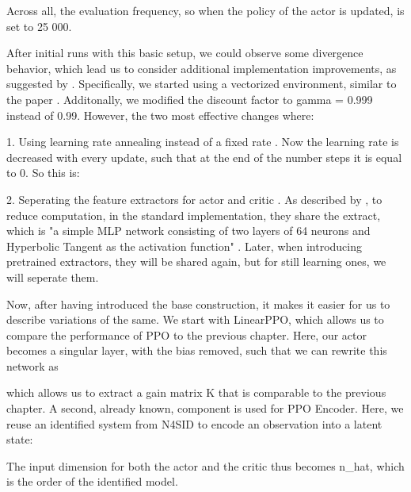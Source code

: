 
Across all, the evaluation frequency, so when the policy of the actor is updated, is set to 25 000.

After initial runs with this basic setup, we could observe some divergence behavior, which
lead us to consider additional implementation improvements, as suggested by .
Specifically, we started using a vectorized environment, similar to the paper . Additonally,
we modified the discount factor to gamma = 0.999 instead of 0.99. However, the two most effective changes
where:

1. Using learning rate annealing instead of a fixed rate . Now the learning
rate is decreased with every update, such that at the end of the number steps  it is equal
to 0. So this is: %

2. Seperating the feature extractors for actor and critic . As described by
, to reduce computation, in the standard implementation,
they share the extract, which is "a simple MLP network consisting of two layers of 64 neurons and Hyperbolic Tangent as the activation function" .
Later, when introducing pretrained extractors, they will be shared again, but for still learning ones, we will seperate them.

Now, after having introduced the base construction, it makes it easier for us to describe variations of the same. We start with
LinearPPO, which allows us to compare the performance of PPO to the previous chapter. Here, our actor becomes a singular layer,
with the bias removed, such that we can rewrite this network as


which allows us to extract a gain matrix K that is comparable to the previous chapter. A second, already known, component is
used for PPO Encoder. Here, we reuse an identified system from N4SID  to encode an observation into
a latent state:


The input dimension for both the actor and the critic thus becomes n_hat, which is the order of the identified model.

